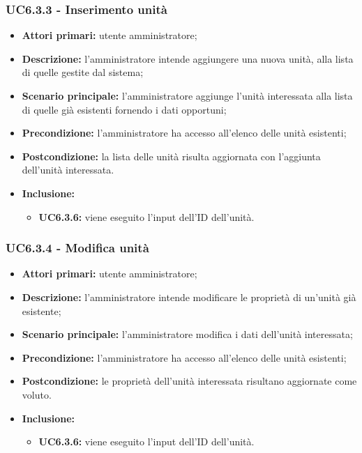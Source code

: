 \subsubsection{UC6.3.3 - Inserimento unità}
	\begin{itemize}
		\item \textbf{Attori primari:} utente amministratore;
		\item \textbf{Descrizione:} l'amministratore intende aggiungere una nuova unità, alla lista di quelle gestite dal sistema;
		\item \textbf{Scenario principale:} l'amministratore aggiunge l'unità interessata alla lista di quelle già esistenti fornendo i dati opportuni;
		\item \textbf{Precondizione:} l'amministratore ha accesso all'elenco delle unità esistenti;
		\item \textbf{Postcondizione:} la lista delle unità risulta aggiornata con l'aggiunta dell'unità interessata.
		\item \textbf{Inclusione:} 
		\begin{itemize}
			\item \textbf{UC6.3.6:} viene eseguito l'input dell'ID dell'unità.
		\end{itemize}
	\end{itemize}

\subsubsection{UC6.3.4 - Modifica unità}
	\begin{itemize}
		\item \textbf{Attori primari:} utente amministratore;
		\item \textbf{Descrizione:} l'amministratore intende modificare le proprietà di un'unità già esistente;
		\item \textbf{Scenario principale:} l'amministratore modifica i dati dell'unità interessata;
		\item \textbf{Precondizione:} l'amministratore ha accesso all'elenco delle unità esistenti;
		\item \textbf{Postcondizione:} le proprietà dell'unità interessata risultano aggiornate come voluto.
		\item \textbf{Inclusione:} 
		\begin{itemize}
			\item \textbf{UC6.3.6:} viene eseguito l'input dell'ID dell'unità.
		\end{itemize}
	\end{itemize}

